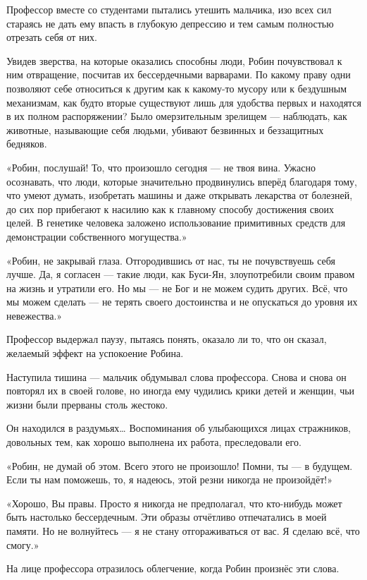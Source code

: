 \documentclass[a5paper, 9pt,
final, openany, twoside=true]{memoir}
\begin{document}
Профессор вместе со студентами пытались утешить мальчика, изо всех сил стараясь не дать ему впасть в глубокую депрессию и тем самым полностью отрезать себя от них.

Увидев зверства, на которые оказались способны люди, Робин почувствовал к ним отвращение, посчитав их бессердечными варварами. По какому праву одни позволяют себе относиться к другим как к какому-то мусору или к бездушным механизмам, как будто вторые существуют лишь для удобства первых и находятся в их полном распоряжении? Было омерзительным зрелищем — наблюдать, как животные, называющие себя людьми, убивают 
безвинных и беззащитных бедняков.\bigskip

«Робин, послушай! То, что произошло сегодня — не твоя вина. Ужасно осознавать, что люди, которые значительно продвинулись вперёд благодаря тому, что умеют думать, изобретать машины и даже открывать лекарства от болезней, до сих пор прибегают к насилию как к главному способу достижения своих целей. В генетике человека заложено использование примитивных средств для демонстрации собственного могущества.»

«Робин, не закрывай глаза. Отгородившись от нас, ты не почувствуешь себя лучше. Да, я согласен — такие люди, как Буси-Ян, злоупотребили своим правом на жизнь и утратили его. Но мы — не Бог и не можем судить других. Всё, что мы можем сделать — не терять своего достоинства и не опускаться до уровня их невежества.»

Профессор выдержал паузу, пытаясь понять, оказало ли то, что он сказал, желаемый эффект на успокоение Робина.

Наступила тишина — мальчик обдумывал слова профессора. Снова и снова он повторял их в своей голове, но иногда ему чудились крики детей и женщин, чьи жизни были прерваны столь жестоко.

Он находился в раздумьях… Воспоминания об улыбающихся лицах стражников, довольных тем, как хорошо выполнена их работа, преследовали его.

«Робин, не думай об этом. Всего этого не произошло! Помни, ты — в будущем. Если ты нам поможешь, то, я надеюсь, этой резни никогда не произойдёт!»

«Хорошо, Вы правы. Просто я никогда не предполагал, что кто-нибудь может быть настолько бессердечным. Эти образы отчётливо отпечатались в моей памяти. Но не волнуйтесь — я не стану отгораживаться от вас. Я сделаю всё, что смогу.»

На лице профессора отразилось облегчение, когда Робин произнёс эти слова.
\end{document}
